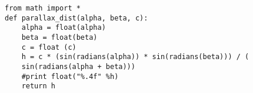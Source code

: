 \documentclass{article}
\begin{document}
\lstset{language=Python}
\begin{lstlisting}
from math import *
def parallax_dist(alpha, beta, c):
	alpha = float(alpha)
    beta = float(beta)
    c = float (c)
    h = c * (sin(radians(alpha)) * sin(radians(beta))) / (
    sin(radians(alpha + beta)))
    #print float("%.4f" %h)
    return h                                                         
\end{lstlisting}
\end{document}
